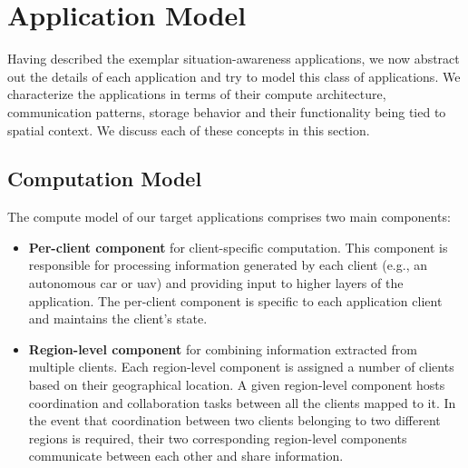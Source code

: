 \section{Application Model}
Having described the exemplar situation-awareness applications, we now abstract out the details of each application and try to model this class of applications. We characterize the applications in terms of their compute architecture, communication patterns, storage behavior and their functionality being tied to spatial context. We discuss each of these concepts in this section.

\subsection{Computation Model}
\label{sec:app_model_compute}
The compute model of our target applications comprises two main components:
\begin{itemize}
\item \textbf{Per-client component} for client-specific computation. This component is responsible for processing information generated by each client (e.g., an autonomous car or \gls{uav}) and providing input to higher layers of the application. The per-client component is specific to each application client and maintains the client's state.
\item \textbf{Region-level component} for combining information extracted from multiple clients. Each region-level component is assigned a number of clients based on their geographical location. A given region-level component hosts  coordination and collaboration tasks between all the clients mapped to it. In the event that coordination between two clients belonging to two different regions is required, their two corresponding region-level components communicate between each other and share information.
\end{itemize}
